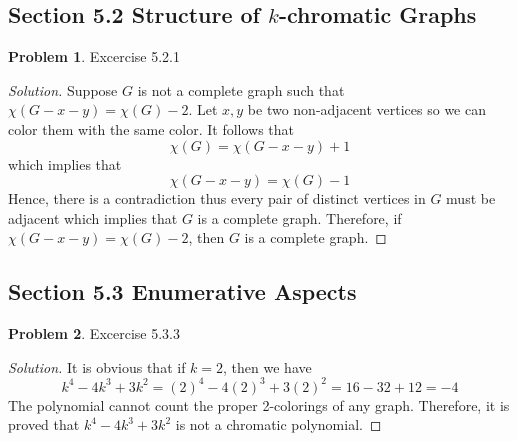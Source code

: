 \documentclass[12pt]{article}
\theoremstyle{definition}
\newtheorem{problem}{Problem}
\newenvironment*{solution}{\begin{proof}[Solution]}{\end{proof}}
\begin{document}
\subsection*{Section 5.2 Structure of \(k\)-chromatic Graphs}
\begin{problem}
    Excercise 5.2.1
\end{problem}
\begin{solution}
    Suppose \(G\) is not a complete graph such that
    \(\chi(G-x-y) = \chi(G)-2\).
    Let \(x,y\) be two non-adjacent vertices so we can color them with the
    same color.
    It follows that \[\chi(G) = \chi(G-x-y)+1\] which implies that
    \[\chi(G-x-y) = \chi(G)-1\]
    Hence, there is a contradiction thus every pair of distinct vertices in
    \(G\) must be adjacent which implies that \(G\) is a complete graph.
    Therefore, if \(\chi(G-x-y) = \chi(G)-2\), then \(G\) is a complete graph.
\end{solution}

\subsection*{Section 5.3 Enumerative Aspects}
\begin{problem}
    Excercise 5.3.3
\end{problem}
\begin{solution}
    It is obvious that if \(k=2\), then we have
    \[k^4-4k^3+3k^2 = (2)^4-4(2)^3+3(2)^2 = 16-32+12 = -4\]
    The polynomial cannot count the proper 2-colorings of any graph.
    Therefore, it is proved that \(k^4-4k^3+3k^2\) is not a chromatic
    polynomial.
\end{solution}
\end{document}
